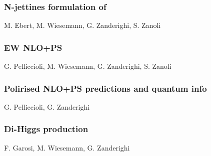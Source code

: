 \documentclass{FBR_Bericht_2025}
\begin{document}
\begin{refsection}
\subsubsection{N-jettines formulation of \minnlo{}}
\begin{Namen}
M. Ebert, M. Wiesemann, G. Zanderighi, S. Zanoli
\end{Namen}
%
\subsubsection{EW NLO+PS}
\begin{Namen}
G. Pelliccioli, M. Wiesemann, G. Zanderighi, S. Zanoli
\end{Namen}
%
\subsubsection{Polirised NLO+PS predictions and quantum info}
\begin{Namen}
G. Pelliccioli, G. Zanderighi
\end{Namen}
%
\subsubsection{Di-Higgs production}
\begin{Namen}
F. Garosi, M. Wiesemann, G. Zanderighi
\end{Namen}
%
\printbibliography[heading=subbibliography]
\end{refsection}

\end{document}
